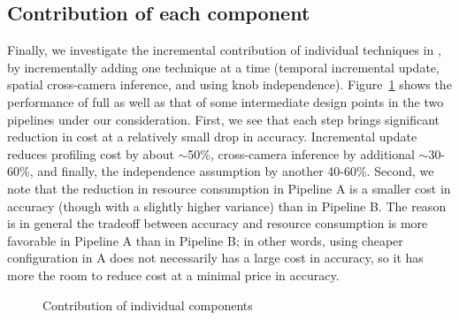 \subsection{Contribution of each component}

Finally, we investigate the incremental contribution of individual techniques in \name, by incrementally adding one technique at a time (temporal incremental update, spatial cross-camera inference, and using knob independence).
Figure~\ref{fig:eval:contrib} shows the performance of full \name as well as that of some intermediate design points in the two pipelines under our consideration.
First, we see that each step brings significant reduction in cost at a relatively small drop in accuracy.
Incremental update reduces profiling cost by about $\sim$50\%, cross-camera inference by additional $\sim$30-60\%, and finally, the independence assumption by another 40-60\%.
Second, we note that the reduction in resource consumption in Pipeline A is a smaller cost in accuracy (though with a slightly higher variance) than in Pipeline B. 
The reason is in general the tradeoff between accuracy and resource consumption is more favorable in Pipeline A than in Pipeline B; in other words, using cheaper configuration in A does not necessarily has a large cost in accuracy, so it has more the room to reduce cost at a minimal price in accuracy.

\begin{figure}[t!]
    \centering
    \hspace{-0.5cm}
    \caption{Contribution of individual components}
    \label{fig:eval:contrib}
\end{figure}